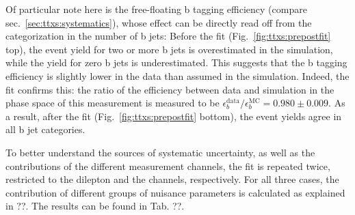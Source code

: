 Of particular note here is the free-floating b tagging efficiency (compare sec.~\ref{sec:ttxs:systematics}), whose effect can be directly read off from the categorization in the number of b jets: Before the fit (Fig.~\ref{fig:ttxs:prepostfit} top), the event yield for two or more b jets is overestimated in the simulation, while the yield for zero b jets is underestimated. This suggests that the b tagging efficiency is slightly lower in the data than assumed in the simulation. Indeed, the fit confirms this: the ratio of the efficiency between data and simulation in the phase space of this measurement is measured to be $\epsilon_b^{\mathrm{data}}/\epsilon_b^{\mathrm{MC}} = 0.980 \pm 0.009$. As a result, after the fit (Fig.~\ref{fig:ttxs:prepostfit} bottom), the event yields agree in all b jet categories.

To better understand the sources of systematic uncertainty, as well as the contributions of the different measurement channels, the fit is repeated twice, restricted to the dilepton and the \ljets channels, respectively. For all three cases, the contribution of different groups of nuisance parameters is calculated as explained in ??. The results can be found in Tab. ??.

